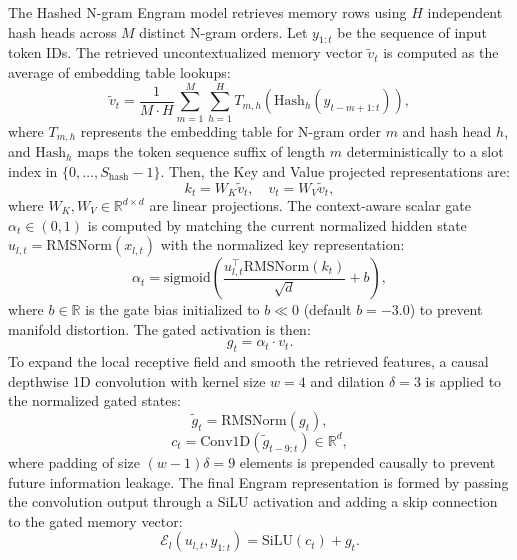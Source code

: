 \documentclass[11pt]{article}
\newcommand{\Eng}{\mathcal{E}}
\newcommand{\RMS}{\mathrm{RMSNorm}}
\newcommand{\sigmoid}{\mathrm{sigmoid}}
\begin{document}
The Hashed N-gram Engram model retrieves memory rows using $H$ independent hash heads across $M$ distinct N-gram orders. Let $y_{1:t}$ be the sequence of input token IDs. The retrieved uncontextualized memory vector $\tilde{v}_t$ is computed as the average of embedding table lookups:
\begin{equation}
\tilde{v}_t = \frac{1}{M \cdot H} \sum_{m=1}^M \sum_{h=1}^H T_{m,h}(\text{Hash}_h(y_{t-m+1:t})),
\end{equation}
where $T_{m,h}$ represents the embedding table for N-gram order $m$ and hash head $h$, and $\text{Hash}_h$ maps the token sequence suffix of length $m$ deterministically to a slot index in $\{0, \ldots, S_{\text{hash}}-1\}$.
Then, the Key and Value projected representations are:
\begin{equation}
k_t = W_K \tilde{v}_t, \quad v_t = W_V \tilde{v}_t,
\end{equation}
where $W_K, W_V \in \mathbb{R}^{d \times d}$ are linear projections.
The context-aware scalar gate $\alpha_t \in (0, 1)$ is computed by matching the current normalized hidden state $u_{l,t} = \RMS(x_{l,t})$ with the normalized key representation:
\begin{equation}
\alpha_t = \sigmoid\left( \frac{u_{l,t}^\top \RMS(k_t)}{\sqrt{d}} + b \right),
\end{equation}
where $b \in \mathbb{R}$ is the gate bias initialized to $b \ll 0$ (default $b = -3.0$) to prevent manifold distortion.
The gated activation is then:
\begin{equation}
g_t = \alpha_t \cdot v_t.
\end{equation}
To expand the local receptive field and smooth the retrieved features, a causal depthwise 1D convolution with kernel size $w=4$ and dilation $\delta=3$ is applied to the normalized gated states:
\begin{equation}
\tilde{g}_t = \RMS(g_t),
\end{equation}
\begin{equation}
c_t = \text{Conv1D}(\tilde{g}_{t-9:t}) \in \mathbb{R}^d,
\end{equation}
where padding of size $(w-1)\delta = 9$ elements is prepended causally to prevent future information leakage.
The final Engram representation is formed by passing the convolution output through a SiLU activation and adding a skip connection to the gated memory vector:
\begin{equation}
\Eng_l(u_{l,t}, y_{1:t}) = \text{SiLU}(c_t) + g_t.
\end{equation}
\end{document}
